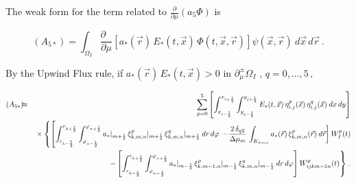 \documentclass[11pt]{article}
\newcommand{\ot}{\frac{1}{2}}
\begin{document}
The weak form for the term related to $\frac{\partial}{\partial \mu} \left( a_5 \Phi \right) $ is  

$$
(A_{5*}) =
\int_{\Omega_{I}}
\frac{\partial \mbox{ }}{\partial \mu} 
\left[ a_{*}(\vec{r}) \, E_{*}(t,\vec{x}) \, \Phi(t,\vec{x},\vec{r}) \right] 
\psi(\vec{x},\vec{r}) \: d\vec{x} \, d\vec{r}  \, .
$$

%
By the Upwind Flux rule, if $a_{*}(\vec{r}) \, E_{*}(t,\vec{x}) > 0$ in $\partial_{\mu}^{\pm} \Omega_{I}$  
, $q = 0, ...,5 \, ,$

%
{\small
\begin{eqnarray*}
(A_{5*}) \hspace{-5pt} 
&
\approx
&
%
\sum_{p=0}^{5} 
\left[ %
\int_{x_{i - \ot}}^{x_{i + \ot}} 
\int_{y_{j - \ot}}^{y_{j + \ot}} 
E_{*}(t,\vec{x}) \, \eta^{p}_{i,j}(\vec{x}) \, \eta^{q}_{i,j}(\vec{x}) \:dx \, dy %
\right] 
\\
& &
\mbox{} %
\times \left\lbrace 
\left[ %
\int_{r_{k - \ot}}^{r_{k + \ot}}
\int_{\varphi_{n - \ot}}^{\varphi_{n + \ot}}
a_{*}|_{m + \ot} \, \xi^{p}_{k,m,n}|_{m + \ot} \, 
\xi^{q}_{k,m,n}|_{m + \ot} \: dr \, d\varphi 
\right.
\right.
\left.
- \dfrac{2 \, \delta_{q2}}{\Delta \mu_{m}} \,  \int_{K_{kmn}}
a_{*}(\vec{r}) \,  \xi^{p}_{k,m,n}(\vec{r}) \: 
d\vec{r}  
\right] 
 W_{I}^p (t)
\\
&&
\left.
- \left[ %
\int_{r_{k - \ot}}^{r_{k + \ot}} 
\int_{\varphi_{n - \ot}}^{\varphi_{n + \ot}} 
a_{*}|_{m - \ot} \, \xi^{p}_{k,m-1,n}|_{m - \ot} \, 
\xi^{q}_{k,m,n}|_{m - \ot} \: dr \, d\varphi %
\right] 
 W_{ijkm-1  n}^p(t) \right\rbrace \, .
\end{eqnarray*}
}%
%
%
\end{document}
